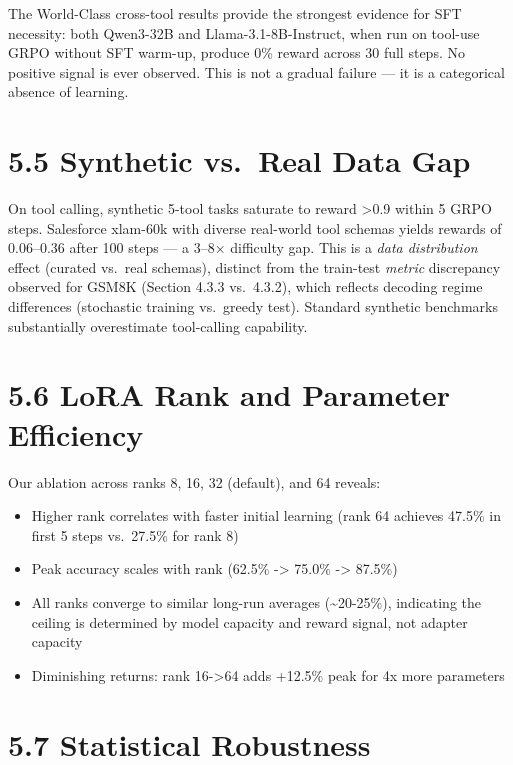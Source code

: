 \documentclass[
  american,
  11pt,
  a4paper,
  oneside]{report}
\providecommand{\tightlist}{%
  \setlength{\itemsep}{0pt}\setlength{\parskip}{0pt}}
\begin{document}
The World-Class cross-tool results provide the strongest evidence for
SFT necessity: both Qwen3-32B and Llama-3.1-8B-Instruct, when run on
tool-use GRPO without SFT warm-up, produce 0\% reward across 30 full
steps. No positive signal is ever observed. This is not a gradual
failure --- it is a categorical absence of learning.

\section{5.5 Synthetic vs.~Real Data
Gap}\label{synthetic-vs.-real-data-gap}

On tool calling, synthetic 5-tool tasks saturate to reward
\textgreater0.9 within 5 GRPO steps. Salesforce xlam-60k with diverse
real-world tool schemas yields rewards of 0.06--0.36 after 100 steps ---
a 3--8× difficulty gap. This is a \emph{data distribution} effect
(curated vs.~real schemas), distinct from the train-test \emph{metric}
discrepancy observed for GSM8K (Section 4.3.3 vs.~4.3.2), which reflects
decoding regime differences (stochastic training vs.~greedy test).
Standard synthetic benchmarks substantially overestimate tool-calling
capability.

\section{5.6 LoRA Rank and Parameter
Efficiency}\label{lora-rank-and-parameter-efficiency}

Our ablation across ranks 8, 16, 32 (default), and 64 reveals:

\begin{itemize}
\tightlist
\item
  Higher rank correlates with faster initial learning (rank 64 achieves
  47.5\% in first 5 steps vs.~27.5\% for rank 8)
\item
  Peak accuracy scales with rank (62.5\% -\textgreater{} 75.0\%
  -\textgreater{} 87.5\%)
\item
  All ranks converge to similar long-run averages
  (\textasciitilde20-25\%), indicating the ceiling is determined by
  model capacity and reward signal, not adapter capacity
\item
  Diminishing returns: rank 16-\textgreater64 adds +12.5\% peak for 4x
  more parameters
\end{itemize}

\section{5.7 Statistical Robustness}\label{statistical-robustness}
\end{document}
